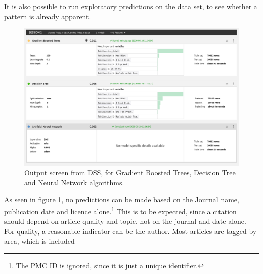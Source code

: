 \documentclass[11pt]{article}
\begin{document}
It is also possible to run exploratory predictions on the data set, to see whether a pattern is already apparent.

\begin{figure}
\includegraphics[width=\textwidth]{figures/Quick_search_through_algorithms.png}
\caption{Output screen from DSS, for Gradient Boosted Trees, Decision Tree and Neural Network algorithms.}\label{fig:dss_initial}
\end{figure}

As seen in figure \ref{fig:dss_initial}, no predictions can be made based on the Journal name, publication date and licence alone.\footnote{The PMC ID is ignored, since it is just a unique identifier.} This is to be expected, since a citation should depend on article quality and topic, not on the journal and date alone. For quality, a reasonable indicator can be the author. Most articles are tagged by area, which is included 
\end{document}

